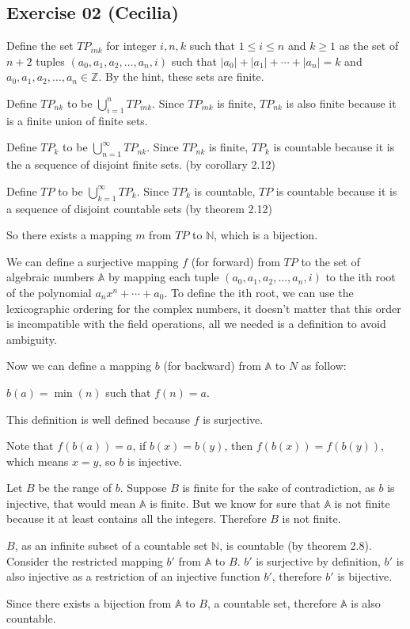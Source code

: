 \subsection*{Exercise 02 (Cecilia)}
Define the set $ TP_{ink} $ for integer $ i, n, k $ such that $ 1 \leq i \leq n $ and $ k \ge 1 $ as the set of $ n + 2 $ tuples $ (a_0, a_1, a_2, \dots, a_n, i) $ such that $ |a_0| + |a_1| + \cdots + |a_n| = k $ and $ a_0, a_1, a_2, \dots, a_n \in \mathbb{Z} $. By the hint, these sets are finite.

Define $ TP_{nk} $ to be $ \bigcup\limits_{i=1}^n TP_{ink} $. Since $ TP_{ink} $ is finite, $ TP_{nk} $ is also finite because it is a finite union of finite sets.

Define $ TP_k $ to be $ \bigcup\limits_{n=1}^\infty TP_{nk} $. Since $ TP_{nk} $ is finite, $ TP_k $ is countable because it is the a sequence of disjoint finite sets. (by corollary 2.12)

Define $ TP $ to be $ \bigcup\limits_{k=1}^\infty TP_k $. Since $ TP_k $ is countable, $ TP $ is countable because it is a sequence of disjoint countable sets (by theorem 2.12)

So there exists a mapping $ m $ from $ TP $ to $ \mathbb{N} $, which is a bijection.

We can define a surjective mapping $ f $ (for forward) from $ TP $ to the set of algebraic numbers $ \mathbb{A} $ by mapping each tuple $ (a_0, a_1, a_2, \dots, a_n, i) $ to the ith root of the polynomial $ a_nx^n + \cdots + a_0 $. To define the ith root, we can use the lexicographic ordering for the complex numbers, it doesn't matter that this order is incompatible with the field operations, all we needed is a definition to avoid ambiguity.

Now we can define a mapping $ b $ (for backward) from $ \mathbb{A} $ to $ N $ as follow:

$ b(a) = \min(n) $  such that $ f(n) = a $.

This definition is well defined because $ f $ is surjective.

Note that $ f(b(a)) = a $, if $ b(x) = b(y) $, then $ f(b(x)) = f(b(y)) $, which means $ x = y $, so $ b $ is injective.

Let $ B $ be the range of $ b $. Suppose $ B $ is finite for the sake of contradiction, as $ b $ is injective, that would mean $ \mathbb{A} $ is finite. But we know for sure that $ \mathbb{A} $ is not finite because it at least contains all the integers. Therefore $ B $ is not finite.

$ B $, as an infinite subset of a countable set $ \mathbb{N} $, is countable (by theorem 2.8). Consider the restricted mapping $ b' $ from $ \mathbb{A} $ to $ B $. $ b' $ is surjective by definition, $ b' $ is also injective as a restriction of an injective function $ b' $, therefore $ b' $ is bijective.

Since there exists a bijection from $ \mathbb{A} $ to $ B $, a countable set, therefore $ \mathbb{A} $ is also countable.